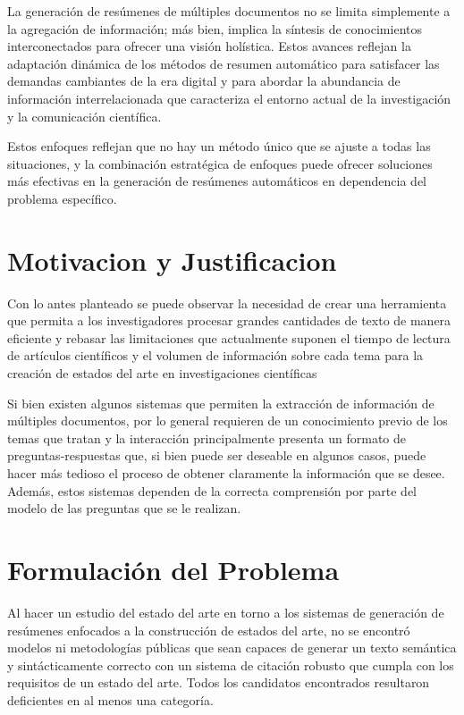     La generación de resúmenes de múltiples documentos no se limita simplemente a la agregación de información; más bien, implica la síntesis de conocimientos interconectados para ofrecer una visión holística. 
    Estos avances reflejan la adaptación dinámica de los métodos de resumen automático para satisfacer las demandas cambiantes de la era digital y para abordar la abundancia de información interrelacionada que caracteriza el entorno actual de la investigación y la comunicación científica.

    Estos enfoques reflejan que no hay un método único que se ajuste a todas las situaciones, y la combinación estratégica de enfoques puede ofrecer soluciones más efectivas en la generación de resúmenes automáticos en dependencia del problema específico.



\section{Motivacion y Justificacion}

    Con lo antes planteado se puede observar la necesidad de crear una herramienta que permita a los investigadores procesar grandes cantidades de texto de manera eficiente y rebasar las limitaciones que actualmente suponen el tiempo de lectura de artículos científicos y el volumen de información sobre cada tema para la creación de estados del arte en investigaciones científicas


    Si bien existen algunos sistemas\cite{elicit, scite} que permiten la extracción de información de múltiples documentos, por lo general requieren de un conocimiento previo de los temas que tratan y la interacción principalmente presenta un formato de preguntas-respuestas que, si bien puede ser deseable en algunos casos, puede hacer más tedioso el proceso de obtener claramente la información que se desee. Además, estos sistemas dependen de la correcta comprensión por parte del modelo de las preguntas que se le realizan.

\section{Formulación del Problema}
    Al hacer un estudio del estado del arte en torno a los sistemas de generación de resúmenes enfocados a la construcción de estados del arte, no se encontró modelos ni metodologías públicas que sean capaces de generar un texto semántica y sintácticamente correcto con un sistema de citación robusto que cumpla con los requisitos de un estado del arte. Todos los candidatos encontrados resultaron deficientes en al menos una categoría.

